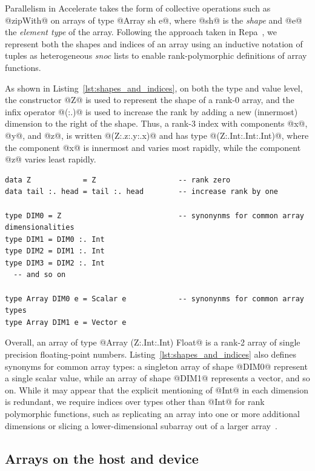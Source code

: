 Parallelism in Accelerate takes the form of collective operations such as
@zipWith@ on arrays of type @Array sh e@, where @sh@ is the \emph{shape} and @e@
the \emph{element type} of the array. Following the approach taken in
Repa~\cite{Keller:2010er}, we represent both the shapes and indices of an array
using an inductive notation of tuples as heterogeneous \emph{snoc} lists to
enable rank-polymorphic definitions of array functions.

As shown in Listing~\ref{lst:shapes_and_indices}, on both the type and value
level, the constructor @Z@ is used to represent the shape of a rank-0 array, and
the infix operator @(:.)@ is used to increase the rank by adding a new (innermost)
dimension to the right of the shape. Thus, a rank-3 index with components @x@,
@y@, and @z@, is written @(Z:.z:.y:.x)@ and has type @(Z:.Int:.Int:.Int)@, where
the component @x@ is innermost and varies most rapidly, while the component @z@
varies least rapidly.

\begin{lstlisting}[style=haskell_float
    ,label=lst:shapes_and_indices
    ,caption={Types of array shapes and indices}]
data Z            = Z                   -- rank zero
data tail :. head = tail :. head        -- increase rank by one

type DIM0 = Z                           -- synonynms for common array dimensionalities
type DIM1 = DIM0 :. Int
type DIM2 = DIM1 :. Int
type DIM3 = DIM2 :. Int
  -- and so on

type Array DIM0 e = Scalar e            -- synonynms for common array types
type Array DIM1 e = Vector e
\end{lstlisting}

Overall, an array of type @Array (Z:.Int:.Int) Float@ is a rank-2 array of
single precision floating-point numbers. Listing~\ref{lst:shapes_and_indices}
also defines synonyms for common array types: a singleton array of shape @DIM0@
represent a single scalar value, while an array of shape @DIM1@ represents a
vector, and so on. While it may appear that the explicit mentioning of @Int@ in
each dimension is redundant, we require indices over types other than @Int@ for
rank polymorphic functions, such as replicating an array into one or more
additional dimensions or slicing a lower-dimensional subarray out of a larger
array~\cite{Keller:2010er,Chakravarty:2011fr}.


\subsection{Arrays on the host and device}
\label{sec:arrays_on_the_host_and_device}


